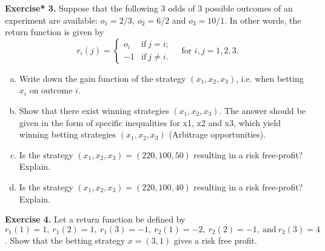 \documentclass[11pt,a4paper]{report}
\begin{document}
    \textbf{Exercise* 3.} Suppose that the following $3$ odds of $3$ possible outcomes of an experiment are available: $o_1 = 2/3,\ o_2 = 6/2$ and $o_3 = 10/1$. In other words, the return function is given by
    $$
    r_i(j)
    =
    \begin{cases}
        o_i & \text{if}\ j = i;\\
        -1 & \text{if}\ j \neq i.
    \end{cases}
    \quad
    \text{for $i, j = 1, 2, 3$.}
    $$
    \begin{enumerate}[(a)]
        \item Write down the gain function of the strategy $(x_1, x_2, x_3)$, i.e. when betting $x_i$ on outcome $i$.
        \item Show that there exist winning strategies $(x_1, x_2, x_3)$. The answer should be given in the form of specific inequalities for x1, x2 and x3, which yield winning betting strategies $(x_1, x_2, x_3)$ (Arbitrage opportunities).
        \item Is the strategy $(x_1, x_2, x_3) = (220, 100, 50)$ resulting in a risk free-profit? Explain.
        \item Is the strategy $(x_1, x_2, x_3) = (220, 100, 40)$ resulting in a risk free-profit? Explain.
    \end{enumerate}
    \textbf{Exercise 4.} Let a return function be defined by $r_1(1) = 1,\ r_1(2) = 1,\ r_1(3) = −1,\ r_2(1) = −2,\ r_2(2) = −1,\ \text{and}\ r_2(3) = 4$. Show that the betting strategy $x = (3, 1)$ gives a risk free profit.    
\end{document}
